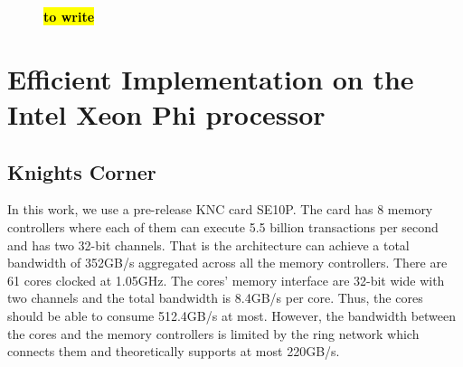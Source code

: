 \documentclass[10pt,conference,compsocconf]{IEEEtran}
\newcommand{\todo}[1]{{\color{red}\textbf{\hl{#1}}\xspace}}
\begin{document}
\begin{figure}
  
  \centering 
%
  
  \caption{\todo{to write}}

\end{figure}

\section{Efficient Implementation on the Intel Xeon Phi processor}
\label{sec:impl}

\subsection{Knights Corner}

In this work, we use a pre-release KNC card SE10P. The card has 8
memory controllers where each of them can execute 5.5 billion
transactions per second and has two 32-bit channels. That is the
architecture can achieve a total bandwidth of 352GB/s aggregated
across all the memory controllers. There are 61 cores clocked at
1.05GHz. The cores’ memory interface are 32-bit wide with two channels
and the total bandwidth is 8.4GB/s per core. Thus, the cores should be
able to consume 512.4GB/s at most. However, the bandwidth between
the cores and the memory controllers is limited by the ring network
which connects them and theoretically supports at most 220GB/s.
\end{document}
